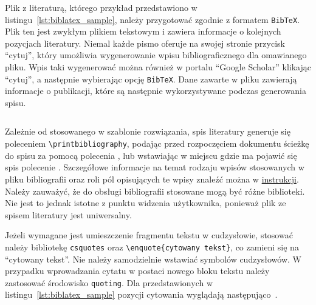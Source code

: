 Plik z literaturą, którego przykład przedstawiono w listingu~\ref{lst:biblatex_sample}, należy przygotować zgodnie z formatem \texttt{BibTeX}. Plik ten jest zwykłym plikiem tekstowym i zawiera informacje o kolejnych pozycjach literatury. Niemal każde pismo oferuje na swojej stronie przycisk \enquote{cytuj}, który umożliwia wygenerowanie wpisu bibliograficznego dla omawianego pliku. Wpis taki wygenerować można również w portalu \enquote{Google Scholar} klikając \enquote{cytuj}, a następnie wybierając opcję \texttt{BibTeX}. Dane zawarte w pliku zawierają informacje o publikacji, które są następnie wykorzystywane podczas generowania spisu.

\begin{listing}[htb]
\inputminted{bibtex}{skrypty/biblatex_sample.bib}
\end{listing}

Zależnie od stosowanego w szablonie rozwiązania, spis literatury generuje się poleceniem \verb|\printbibliography|, podając przed rozpoczęciem dokumentu ścieżkę do spisu za pomocą polecenia \verb||, lub wstawiając w miejscu gdzie ma pojawić się spis polecenie \verb||. Szczegółowe informacje na temat rodzaju wpisów stosowanych w pliku bibliografii oraz roli pól opisujących te wpisy znaleźć można w \href{https://www.overleaf.com/learn/latex/Bibliography_management_in_LaTeX}{instrukcji}. Należy zauważyć, że do obsługi bibliografii stosowane mogą być różne biblioteki. Nie jest to jednak istotne z punktu widzenia użytkownika, ponieważ plik ze spisem literatury jest uniwersalny.

Jeżeli wymagane jest umieszczenie fragmentu tekstu w cudzysłowie, stosować należy bibliotekę \texttt{csquotes} oraz \verb|\enquote{cytowany tekst}|, co zamieni się na \enquote{cytowany tekst}. Nie należy samodzielnie wstawiać symbolów cudzysłowów. W przypadku wprowadzania cytatu w postaci nowego bloku tekstu należy zastosować środowisko \texttt{quoting}. Dla przedstawionych w listingu~\ref{lst:biblatex_sample} pozycji cytowania wyglądają następująco~\cite{ldrjro_dwtownerr, mallat_wavelet}.
